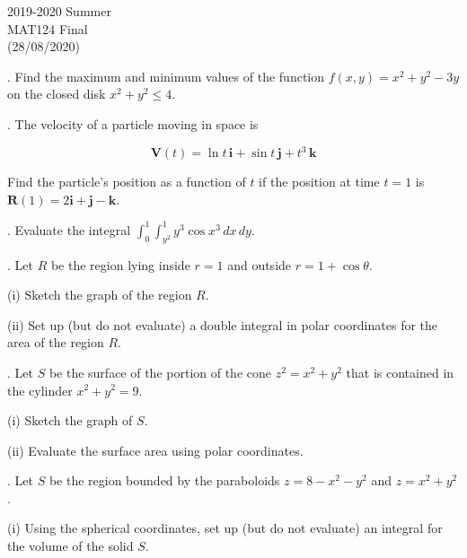\documentclass{article}
\begin{document}
\pagestyle{empty}
\large

\begin{center}
2019-2020 Summer \\MAT124 Final\\(28/08/2020)
\end{center}

. Find the maximum and minimum values of the function $f(x,y)=x^2+y^2-3y$ on the closed disk $x^2+y^2\leq4$.

\hfill

. The velocity of a particle moving in space is

\begin{equation*}
\mathbf{V}(t)=\ln t\,\mathbf{i} +\sin t\,\mathbf{j}+ t^3\,\mathbf{k}
\end{equation*}

\hfill

\noindent Find the particle's position as a function of $t$ if the position at time $t=1$ is $\mathbf{R}(1)=2\mathbf{i}+\mathbf{j}-\mathbf{k}$.

\hfill

. Evaluate the integral $\displaystyle \int_0^1\int_{y^2}^1 y^3\cos x^3\,dx\,dy$.

\hfill

. Let $R$ be the region lying inside $r=1$ and outside $r=1+\cos\theta$.

\hfill

(i) Sketch the graph of the region $R$.

\hfill

(ii) Set up (but do not evaluate) a double integral in polar coordinates for the area of the region $R$.

\hfill

. Let $S$ be the surface of the portion of the cone $z^2=x^2+y^2$ that is contained in the cylinder $x^2+y^2=9$.

\hfill

(i) Sketch the graph of $S$.

\hfill

(ii) Evaluate the surface area using polar coordinates.

\hfill

. Let $S$ be the region bounded by the paraboloids $z=8-x^2-y^2$ and $z=x^2+y^2$.

\hfill

(i) Using the spherical coordinates, set up (but do not evaluate) an integral for the volume of the solid $S$.
\end{document}
